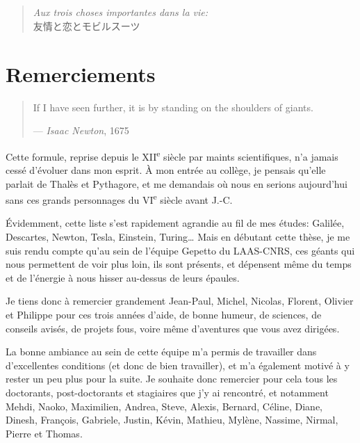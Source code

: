 ~

\newpage

~

\vfill

\begin{quote}
    \par\raggedleft
    \emph{Aux trois choses importantes dans la vie:} \\
    {\LARGE 友情と恋とモビルスーツ}
\end{quote}

\vfill\vfill


\chapter*{Remerciements}

\begin{quote}
    If I have seen further, it is by standing on the shoulders of giants.
    \par\raggedleft--- \emph{Isaac Newton}, 1675
\end{quote}

Cette formule, reprise depuis le XII\textsuperscript{e} siècle par maints scientifiques, n'a jamais cessé d'évoluer dans
mon esprit. À mon entrée au collège, je pensais qu'elle parlait de Thalès et Pythagore, et me demandais où nous en
serions aujourd'hui sans ces grands personnages du VI\textsuperscript{e} siècle avant J.-C.

Évidemment, cette liste s'est rapidement agrandie au fil de mes études: Galilée, Descartes, Newton, Tesla, Einstein,
Turing\ldots{} Mais en débutant cette thèse, je me suis rendu compte qu'au sein de l'équipe Gepetto du LAAS-CNRS, ces
géants qui nous permettent de voir plus loin, ils sont présents, et dépensent même du temps et de l'énergie à nous
hisser au-dessus de leurs épaules.

Je tiens donc à remercier grandement Jean-Paul, Michel, Nicolas, Florent, Olivier et Philippe pour ces trois années
d'aide, de bonne humeur, de sciences, de conseils avisés, de projets fous, voire même d'aventures que vous avez
dirigées.

La bonne ambiance au sein de cette équipe m'a permis de travailler dans d'excellentes conditions (et donc de bien
travailler), et m'a également motivé à y rester un peu plus pour la suite. Je souhaite donc remercier pour cela tous
les doctorants, post-doctorants et stagiaires que j'y ai rencontré, et notamment Mehdi, Naoko, Maximilien, Andrea,
Steve, Alexis, Bernard, Céline, Diane, Dinesh, François, Gabriele, Justin, Kévin, Mathieu, Mylène, Nassime, Nirmal,
Pierre et Thomas.

